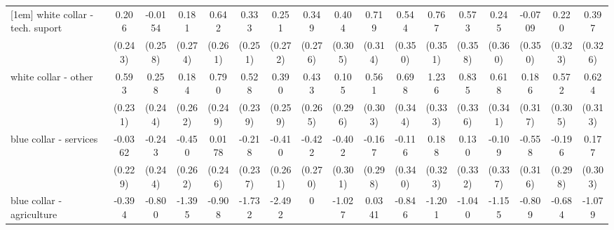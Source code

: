 {\begin{tabular}{l*{16}{c}}
[1em]
white collar - tech. suport&       0.206         &     -0.0154         &       0.181         &       0.642\sym{*}  &       0.333         &       0.251         &       0.349         &       0.404         &       0.719\sym{*}  &       0.544         &       0.767\sym{*}  &       0.573         &       0.245         &     -0.0709         &       0.220         &       0.397         \\
                    &     (0.243)         &     (0.258)         &     (0.274)         &     (0.261)         &     (0.251)         &     (0.272)         &     (0.276)         &     (0.305)         &     (0.314)         &     (0.350)         &     (0.351)         &     (0.358)         &     (0.360)         &     (0.350)         &     (0.323)         &     (0.326)         \\
[1em]
white collar - other&       0.593\sym{*}  &       0.258         &       0.184         &       0.790\sym{**} &       0.528\sym{*}  &       0.390         &       0.433         &       0.105         &       0.561         &       0.698\sym{*}  &       1.236\sym{***}&       0.835\sym{*}  &       0.618         &       0.186         &       0.572         &       0.624\sym{*}  \\
                    &     (0.231)         &     (0.244)         &     (0.262)         &     (0.249)         &     (0.239)         &     (0.259)         &     (0.265)         &     (0.296)         &     (0.303)         &     (0.344)         &     (0.333)         &     (0.336)         &     (0.341)         &     (0.317)         &     (0.305)         &     (0.313)         \\
[1em]
blue collar - services&     -0.0362         &      -0.243         &      -0.450         &      0.0178         &      -0.218         &      -0.410         &      -0.422         &      -0.402         &      -0.167         &      -0.116         &       0.188         &       0.130         &      -0.109         &      -0.558         &      -0.196         &       0.177         \\
                    &     (0.229)         &     (0.244)         &     (0.262)         &     (0.246)         &     (0.237)         &     (0.261)         &     (0.270)         &     (0.301)         &     (0.298)         &     (0.340)         &     (0.323)         &     (0.332)         &     (0.337)         &     (0.316)         &     (0.298)         &     (0.303)         \\
[1em]
blue collar - agriculture&      -0.394         &      -0.800         &      -1.395\sym{*}  &      -0.908         &      -1.732\sym{*}  &      -2.492\sym{*}  &           0         &      -1.027         &      0.0341         &      -0.846         &      -1.201         &      -1.040         &      -1.155         &      -0.809         &      -0.684         &      -1.079         \\

\end{tabular}}
